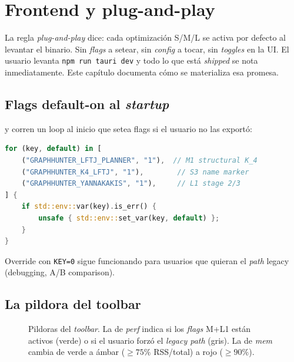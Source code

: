 \chapter{Frontend y plug-and-play}
\label{cap:plug-and-play}

\begin{intuicion}
La regla \emph{plug-and-play} dice: cada optimización S/M/L se
activa por defecto al levantar el binario. Sin \emph{flags} a setear,
sin \emph{config} a tocar, sin \emph{toggles} en la UI. El usuario
levanta \texttt{npm run tauri dev} y todo lo que está \emph{shipped}
se nota inmediatamente. Este capítulo documenta cómo se materializa
esa promesa.
\end{intuicion}

\section{Flags default-on al \emph{startup}}

 y
 corren un loop al inicio que setea
flags si el usuario no las exportó:

\begin{lstlisting}[language=Rust]
for (key, default) in [
    ("GRAPHHUNTER_LFTJ_PLANNER", "1"),  // M1 structural K_4
    ("GRAPHHUNTER_K4_LFTJ", "1"),        // S3 name marker
    ("GRAPHHUNTER_YANNAKAKIS", "1"),     // L1 stage 2/3
] {
    if std::env::var(key).is_err() {
        unsafe { std::env::set_var(key, default) };
    }
}
\end{lstlisting}

Override con \texttt{KEY=0} sigue funcionando para usuarios que
quieran el \emph{path} legacy (debugging, A/B comparison).

\section{La pildora del toolbar}

\begin{figure}[H]
\centering
{}
\caption{Pildoras del \emph{toolbar}. La de \emph{perf} indica si
los \emph{flags} M+L1 están activos (verde) o si el usuario forzó el
\emph{legacy path} (gris). La de \emph{mem} cambia de verde a ámbar
(\(\geq 75\%\) RSS/total) a rojo (\(\geq 90\%\)).}
\label{fig:plug-pills}
\end{figure}

